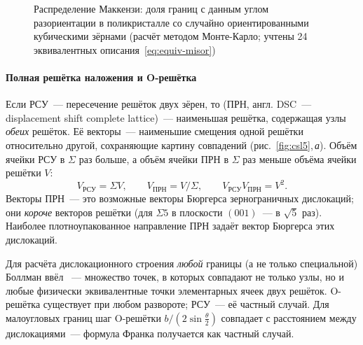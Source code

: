 \begin{figure}[ht]
\centering
{}
\caption{Распределение Маккензи: доля границ с данным углом разориентации
в поликристалле со случайно ориентированными кубическими зёрнами (расчёт
методом Монте-Карло; учтены 24 эквивалентных описания~\eqref{eq:equiv-misor})}
\label{fig:mackenzie}
\end{figure}

\paragraph{Полная решётка наложения и O-решётка}
Если РСУ~— пересечение решёток двух зёрен, то 
(ПРН, англ. DSC~— displacement shift complete lattice)~— наименьшая
решётка, содержащая узлы \emph{обеих} решёток. Её векторы~—
наименьшие смещения одной решётки относительно другой, сохраняющие картину
совпадений (рис.~\ref{fig:csl5},\,\textit{а}). Объём ячейки РСУ в $\Sigma$ раз
больше, а объём ячейки ПРН в $\Sigma$ раз меньше объёма ячейки решётки
$V$:
\[
V_\text{РСУ}=\Sigma V,\qquad V_\text{ПРН}=V/\Sigma,\qquad
V_\text{РСУ}V_\text{ПРН}=V^2 .
\]
Векторы ПРН~— это возможные векторы Бюргерса зернограничных дислокаций;
они \emph{короче} векторов решётки (для $\Sigma5$ в плоскости $(001)$~—
в $\sqrt5$ раз). Наиболее плотноупакованное направление ПРН задаёт вектор
Бюргерса этих дислокаций.

Для расчёта дислокационного строения \emph{любой} границы (а не только
специальной) Боллман ввёл ~— множество точек, в которых
совпадают не только узлы, но и любые физически эквивалентные точки
элементарных ячеек двух решёток. O-решётка существует при любом развороте;
РСУ~— её частный случай. Для малоугловых границ шаг O-решётки
$b/(2\sin\frac\theta2)$ совпадает с расстоянием между дислокациями~—
формула Франка получается как частный случай.

